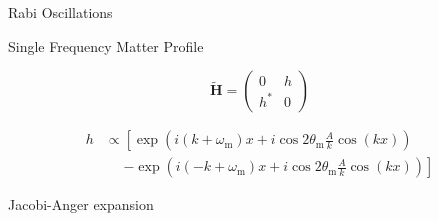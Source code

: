 \documentclass[9pt]{beamer}
\begin{document}
\begin{darkframes}
\begin{frame}{Rabi Oscillations}
{}



\end{frame}




\begin{frame}{Single Frequency Matter Profile}







\begin{tcolorbox}[title=Off-diagonal Term in Our System]

\begin{equation*}
    \mathbf{\widetilde H}= \begin{pmatrix}
    0 & h \\
    h^* & 0
    \end{pmatrix}
\end{equation*}

\begin{align*}
    h & \propto \left[ \exp\left(i(k + \omega_{\mathrm m})x + i\cos 2\theta_{\mathrm m} \frac{A}{k} \cos (k x ) \right) \right. \\
    &\phantom{\propto} \left. - \exp\left(i(-k  + \omega_{\mathrm m})x + i\cos 2\theta_{\mathrm m} \frac{A}{k} \cos (k x ) \right) \right]
\end{align*}

\end{tcolorbox}




Jacobi-Anger expansion


\end{frame}
\end{darkframes}
\end{document}
